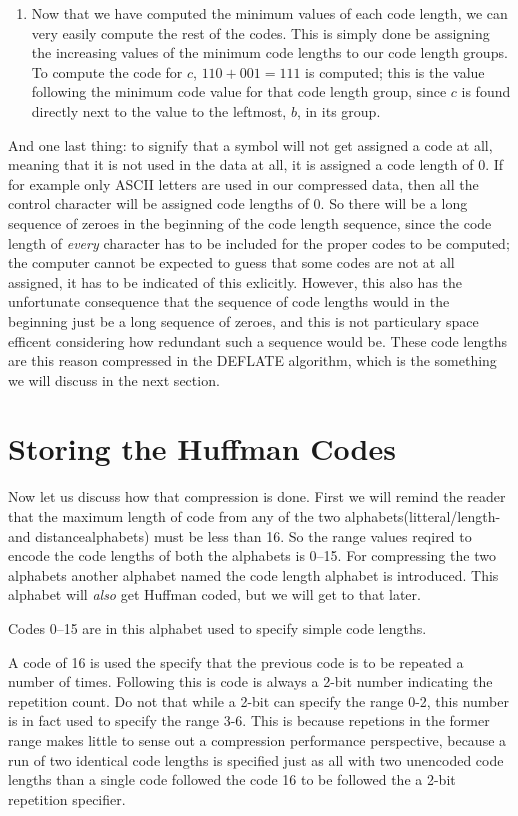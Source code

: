 \begin{enumerate}
  \item Now that we have computed the minimum values of each code
    length, we can very easily compute the rest of the codes. This is
    simply done be assigning the increasing values of the minimum code
    lengths to our code length groups. To compute the code for $c$,
    $110 + 001 = 111$ is computed; this is the value following the
    minimum code value for that code length group, since $c$ is found
    directly next to the value to the leftmost, $b$, in its group.

\end{enumerate}

And one last thing: to signify that a symbol will not get assigned a
code at all, meaning that it is not used in the data at all, it is
assigned a code length of $0$. If for example only ASCII letters are
used in our compressed data, then all the control character will be
assigned code lengths of $0$. So there will be a long sequence of
zeroes in the beginning of the code length sequence, since the code
length of \textit{every} character has to be included for the proper
codes to be computed; the computer cannot be expected to guess that
some codes are not at all assigned, it has to be indicated of this
exlicitly. However, this also has the unfortunate consequence that the
sequence of code lengths would in the beginning just be a long
sequence of zeroes, and this is not particulary space efficent
considering how redundant such a sequence would be. These code lengths
are this reason compressed in the DEFLATE algorithm, which is the
something we will discuss in the next section.

\section{Storing the Huffman Codes}
\label{sec:storing-huffman-codes}

Now let us discuss how that compression is done. First we will remind
the reader that the maximum length of code from any of the two
alphabets(litteral/length- and distancealphabets) must be less than
16. So the range values reqired to encode the code lengths of both the
alphabets is 0--15. For compressing the two alphabets another alphabet
named the code length alphabet is introduced. This alphabet will
\textit{also} get Huffman coded, but we will get to that later.

Codes 0--15 are in this alphabet used to specify simple code
lengths.

A code of 16 is used the specify that the previous code is to be
repeated a number of times. Following this is code is always a 2-bit
number indicating the repetition count. Do not that while a 2-bit can
specify the range 0-2, this number is in fact used to specify the
range 3-6. This is because repetions in the former range makes little
to sense out a compression performance perspective, because a run of
two identical code lengths is specified just as all with two unencoded
code lengths than a single code followed the code 16 to be followed
the a 2-bit repetition specifier.

